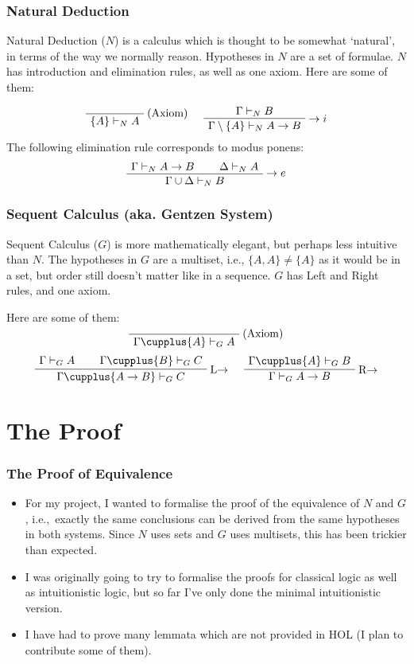 \documentclass[english,svgnames,hide notes,12pt]{beamer}
\theoremstyle{definition}
\theoremstyle{remark}
\begin{document}
\begin{frame}
    \frametitle{Natural Deduction}
    Natural Deduction ($N$) is a calculus which is thought to be somewhat `natural', in terms of the way we normally reason. Hypotheses in $N$ are a set of formulae. $N$ has introduction and elimination rules, as well as one axiom. Here are some of them:

    \[
        \AxiomC{}
        \RightLabel{(Axiom)}
        \UnaryInfC{$\{A\} \vdash_N A$}
        \DisplayProof 
        \hspace{0.5cm}
        \AxiomC{$\Gamma \vdash_N B$}
        \RightLabel{$\to i$}
        \UnaryInfC{$\Gamma\setminus\{A\}\vdash_N A\to B$}
        \DisplayProof
    \]
    The following elimination rule corresponds to modus ponens:
    \[
        \AxiomC{$\Gamma\vdash_N A\to B$}
        \AxiomC{$\Delta\vdash_N A$}
        \RightLabel{$\to e$}
        \BinaryInfC{$\Gamma\cup\Delta\vdash_N B$}
        \DisplayProof
    \]
\end{frame}


\begin{frame}
    \frametitle{Sequent Calculus (aka. Gentzen System)}
    Sequent Calculus ($G$) is more mathematically elegant, but perhaps less intuitive than $N$. The hypotheses in $G$ are a multiset, i.e., $\{A,A\}\neq\{A\}$ as it would be in a set, but order still doesn't matter like in a sequence. $G$ has Left and Right rules, and one axiom.

    Here are some of them:
    \[
        \AxiomC{}
        \RightLabel{(Axiom)}
        \UnaryInfC{$\Gamma \cupplus \{A\}\vdash_G A$}
        \DisplayProof
    \]
    \[
        \AxiomC{$\Gamma\vdash_G A$}
        \AxiomC{$\Gamma\cupplus\{B\}\vdash_G C$}
        \RightLabel{L$\to$}
        \BinaryInfC{$\Gamma\cupplus\{A\to B\}\vdash_G C$}
        \DisplayProof
        \hspace{0.5cm}
        \AxiomC{$\Gamma\cupplus\{A\}\vdash_G B$}
        \RightLabel{R$\to$}
        \UnaryInfC{$\Gamma\vdash_G A\to B$}
        \DisplayProof
    \]
\end{frame}

\section{The Proof}

\begin{frame}
    \frametitle{The Proof of Equivalence}
    \begin{itemize}
        \item For my project, I wanted to formalise the proof of the equivalence of $N$ and $G$, i.e.,\ exactly the same conclusions can be derived from the same hypotheses in both systems. Since $N$ uses sets and $G$ uses multisets, this has been trickier than expected. 
        \item I was originally going to try to formalise the proofs for classical logic as well as intuitionistic logic, but so far I've only done the minimal intuitionistic version.
        \item I have had to prove many lemmata which are not provided in HOL (I plan to contribute some of them).
    \end{itemize}
\end{frame}
\end{document}
